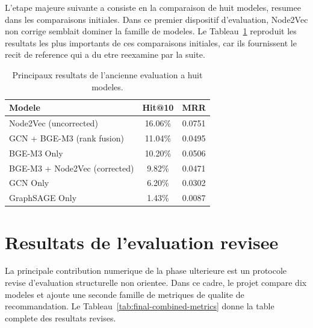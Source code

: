 L'etape majeure suivante a consiste en la comparaison de huit modeles,
resumee dans les comparaisons initiales. Dans ce premier dispositif
d'evaluation, Node2Vec non corrige semblait dominer la famille de modeles. Le
Tableau~\ref{tab:final-report6-topline} reproduit les resultats les plus
importants de ces comparaisons initiales, car ils fournissent le recit de
reference qui a du etre reexamine par la suite.

\begin{table}[H]
\centering
\caption{Principaux resultats de l'ancienne evaluation a huit modeles.}
\label{tab:final-report6-topline}
\begin{tabular}{lcc}
\toprule
\textbf{Modele} & \textbf{Hit@10} & \textbf{MRR} \\
\midrule
Node2Vec (uncorrected) & 16.06\% & 0.0751 \\
GCN + BGE-M3 (rank fusion) & 11.04\% & 0.0495 \\
BGE-M3 Only & 10.20\% & 0.0506 \\
BGE-M3 + Node2Vec (corrected) & 9.82\% & 0.0471 \\
GCN Only & 6.20\% & 0.0302 \\
GraphSAGE Only & 1.43\% & 0.0087 \\
\bottomrule
\end{tabular}
\end{table}

\section{Resultats de l'evaluation revisee}

La principale contribution numerique de la phase ulterieure est un protocole
revise d'evaluation structurelle non orientee. Dans ce cadre, le projet
compare dix modeles et ajoute une seconde famille de metriques de qualite de
recommandation. Le Tableau~\ref{tab:final-combined-metrics} donne la table
complete des resultats revises.

